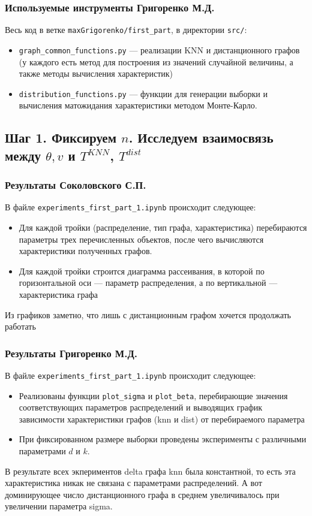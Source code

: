 \documentclass[a4paper,12pt]{article}
\begin{document}
\subsubsection*{Используемые инструменты Григоренко М.Д.}
Весь код в ветке \texttt{maxGrigorenko/first\_part}, в директории \texttt{src/}:
\begin{itemize}
    \item \texttt{graph\_common\_functions.py} --- реализации KNN и дистанционного графов (у каждого есть метод для построения из значений случайной величины, а также методы вычисления характеристик)
    \item \texttt{distribution\_functions.py} --- функции для генерации выборки и вычисления матожидания характеристики методом Монте-Карло.
\end{itemize}


\subsection{Шаг 1. Фиксируем $n$. Исследуем взаимосвязь между $\theta, v$ и $T^{KNN}$, $T^{dist}$}
\subsubsection*{Результаты Соколовского С.П.}
В файле \texttt{experiments\_first\_part\_1.ipynb} происходит следующее:
\begin{itemize}
    \item Для каждой тройки (распределение, тип графа, характеристика) перебираются параметры трех перечисленных объектов, после чего вычисляются характеристики полученных графов.
    \item Для каждой тройки строится диаграмма рассеивания, в которой по горизонтальной оси --- параметр распределения, а по вертикальной --- характеристика графа
\end{itemize}
Из графиков заметно, что лишь с дистанционным графом хочется продолжать работать
\subsubsection*{Результаты Григоренко М.Д.}
В файле \texttt{experiments\_first\_part\_1.ipynb} происходит следующее:
\begin{itemize}
    \item Реализованы функции \texttt{plot\_sigma} и \texttt{plot\_beta}, перебирающие значения соответствующих параметров распределений и выводящих график зависимости характеристики графов (knn и dist) от перебираемого параметра
    \item При фиксированном размере выборки проведены эксперименты с различными параметрами $d$ и $k$.
\end{itemize}
В результате всех экпериментов delta графа knn была константной, то есть
эта характеристика никак не связана с параметрами распределений. А вот доминирующее число дистанционного графа в среднем увеличивалось при увеличении параметра sigma.
\end{document}
